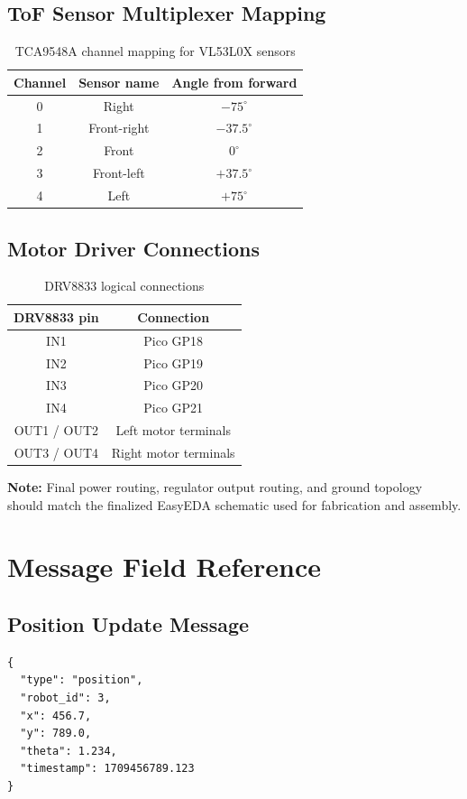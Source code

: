 \documentclass[a4paper,oneside,titlepage,11pt]{report}
\begin{document}
\section{ToF Sensor Multiplexer Mapping}
\begin{table}[H]
\centering
\caption{TCA9548A channel mapping for VL53L0X sensors}
\begin{tabular}{ccc}
\toprule
\textbf{Channel} & \textbf{Sensor name} & \textbf{Angle from forward} \\
\midrule
0 & Right       & $-75^\circ$ \\
1 & Front-right & $-37.5^\circ$ \\
2 & Front       & $0^\circ$ \\
3 & Front-left  & $+37.5^\circ$ \\
4 & Left        & $+75^\circ$ \\
\bottomrule
\end{tabular}
\end{table}

\section{Motor Driver Connections}
\begin{table}[H]
\centering
\caption{DRV8833 logical connections}
\begin{tabular}{cc}
\toprule
\textbf{DRV8833 pin} & \textbf{Connection} \\
\midrule
IN1 & Pico GP18 \\
IN2 & Pico GP19 \\
IN3 & Pico GP20 \\
IN4 & Pico GP21 \\
OUT1 / OUT2 & Left motor terminals \\
OUT3 / OUT4 & Right motor terminals \\
\bottomrule
\end{tabular}
\end{table}

\noindent
\textbf{Note:} Final power routing, regulator output routing, and ground topology should match the finalized EasyEDA schematic used for fabrication and assembly.


\chapter{Message Field Reference}
\label{app:messages}

\section{Position Update Message}
\begin{verbatim}
{
  "type": "position",
  "robot_id": 3,
  "x": 456.7,
  "y": 789.0,
  "theta": 1.234,
  "timestamp": 1709456789.123
}
\end{verbatim}
\end{document}
